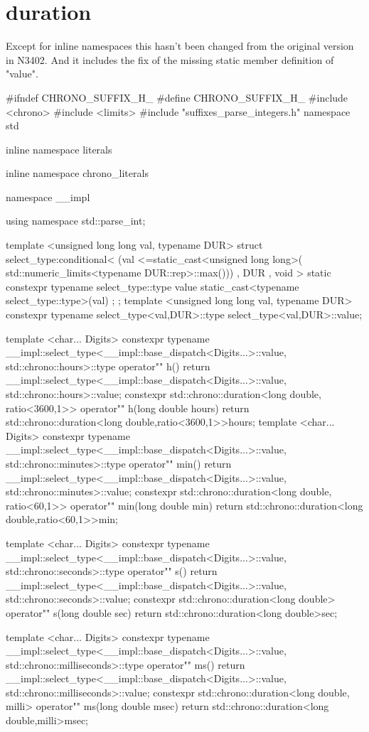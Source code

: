 \documentclass[ebook,11pt,article]{memoir}
\begin{document}
\section{duration}
Except for inline namespaces this hasn't been changed from the original version in N3402. And it includes the fix of the missing static member definition of "value".
\begin{codeblock}
#ifndef CHRONO_SUFFIX_H_
#define CHRONO_SUFFIX_H_
#include <chrono>
#include <limits>
#include "suffixes_parse_integers.h"
namespace std {
inline namespace literals {
inline namespace chrono_literals{

namespace __impl {
using namespace std::parse_int;

template <unsigned long long val, typename DUR>
struct select_type:conditional<
    (val <=static_cast<unsigned long long>(
            std::numeric_limits<typename DUR::rep>::max()))
	, DUR , void > {
		static constexpr typename select_type::type
			value{ static_cast<typename select_type::type>(val) };
};
template <unsigned long long val, typename DUR>
constexpr typename select_type<val,DUR>::type select_type<val,DUR>::value;
}

template <char... Digits>
constexpr typename
__impl::select_type<__impl::base_dispatch<Digits...>::value,
std::chrono::hours>::type
operator"" h(){
	return  __impl::select_type<__impl::base_dispatch<Digits...>::value,
	        std::chrono::hours>::value;
}
constexpr std::chrono::duration<long double, ratio<3600,1>>
operator"" h(long double hours){
	return std::chrono::duration<long double,ratio<3600,1>>{hours};
}
template <char... Digits>
constexpr typename
__impl::select_type<__impl::base_dispatch<Digits...>::value,
std::chrono::minutes>::type
operator"" min(){
	return __impl::select_type<__impl::base_dispatch<Digits...>::value,
	       std::chrono::minutes>::value;
}
constexpr std::chrono::duration<long double, ratio<60,1>>
operator"" min(long double min){
	return std::chrono::duration<long double,ratio<60,1>>{min};
}

template <char... Digits>
constexpr typename
__impl::select_type<__impl::base_dispatch<Digits...>::value,
std::chrono::seconds>::type
operator"" s(){
	return __impl::select_type<__impl::base_dispatch<Digits...>::value,
	       std::chrono::seconds>::value;
}
constexpr std::chrono::duration<long double>
operator"" s(long double sec){
	return std::chrono::duration<long double>{sec};
}

template <char... Digits>
constexpr typename
__impl::select_type<__impl::base_dispatch<Digits...>::value,
std::chrono::milliseconds>::type
operator"" ms(){
	return __impl::select_type<__impl::base_dispatch<Digits...>::value,
	       std::chrono::milliseconds>::value;
}
constexpr std::chrono::duration<long double, milli>
operator"" ms(long double msec){
	return std::chrono::duration<long double,milli>{msec};
}

}}}
\end{codeblock}
\end{document}
